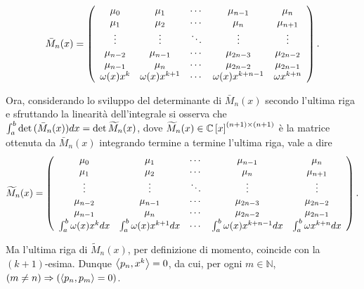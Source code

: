 \[
	\bar{M}_n(x) =
	\left (
	\begin{array}{ccccc}
		\mu_0 & \mu_1 & \cdots & \mu_{n - 1} & \mu_n\\
		\mu_1 & \mu_2 & \cdots & \mu_n & \mu_{n+1}\\
		\vdots & \vdots & \ddots & \vdots & \vdots\\
		\mu_{n - 2} & \mu_{n - 1} & \cdots & \mu_{2n - 3} & \mu_{2n-2}\\
		\mu_{n - 1} & \mu_n & \cdots & \mu_{2n - 2} & \mu_{2n-1}\\
		\omega(x) x^k & \omega(x) x^{k + 1} & \cdots & \omega(x) x^{k + n - 1} & \omega{x^{k + n}}
	\end{array}
	\right ).
\]
\par Ora, considerando lo sviluppo del determinante di $\bar{M}_n(x)$ secondo l'ultima riga e sfruttando la linearit\`a dell'integrale si osserva che $\int_a^b \operatorname{det}{(\bar{M}_n(x))} dx = \operatorname{det}{ \widetilde{M}_n(x) }$, dove $\widetilde{M}_n(x) \in \mathbb{C} \left [ x \right ]^{(n + 1) \times (n + 1)}$ \`e la matrice ottenuta da $\bar{M}_n(x)$ integrando termine a termine l'ultima riga, vale a dire
\[
	\widetilde{M}_n(x) =
	\left (
	\begin{array}{ccccc}
		\mu_0 & \mu_1 & \cdots & \mu_{n - 1} & \mu_n\\
		\mu_1 & \mu_2 & \cdots & \mu_n & \mu_{n+1}\\
		\vdots & \vdots & \ddots & \vdots & \vdots\\
		\mu_{n - 2} & \mu_{n - 1} & \cdots & \mu_{2n - 3} & \mu_{2n-2}\\
		\mu_{n - 1} & \mu_n & \cdots & \mu_{2n - 2} & \mu_{2n-1}\\
		\int_a^b \omega(x) x^k dx & \int_a^b \omega(x) x^{k + 1} dx & \cdots & \int_a^b \omega(x) x^{k + n - 1} dx & \int_a^b \omega{x^{k + n}} dx
	\end{array}
	\right ).
\]
\par Ma l'ultima riga di $\widetilde{M}_n(x)$, per definizione di momento, coincide con la $(k + 1)$-esima. Dunque $\left \langle p_n , x^k \right \rangle = 0$, da cui, per ogni $m \in \mathbb{N}$, $\left ( m \neq n \right ) \Rightarrow \left ( \left \langle p_n , p_m \right \rangle = 0 \right )$. \EndProof

